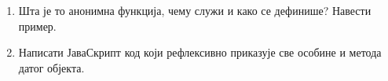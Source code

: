 \documentclass[a4paper]{article}
\begin{document}
\begin{enumerate}
\hrulefill

\hrulefill

\hrulefill


\item Шта је то анонимна функција, чему служи и како се дефинише? Навести пример. \hrulefill

\hrulefill

\hrulefill

\hrulefill

\hrulefill

\hrulefill

\hrulefill

\hrulefill

\hrulefill

\hrulefill

\hrulefill


\item Написати ЈаваСкрипт код који рефлексивно приказује све особине и метода датог објекта. 

\hrulefill

\hrulefill

\hrulefill

\hrulefill

\hrulefill

\hrulefill

\hrulefill

\hrulefill

\hrulefill

\hrulefill


\end{enumerate}
\end{document}

